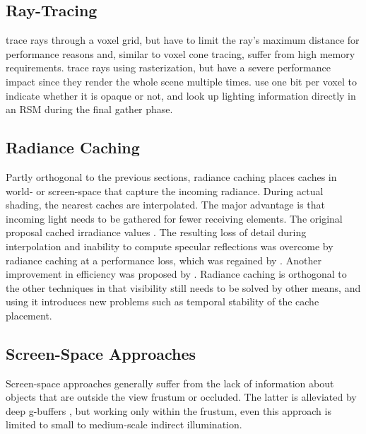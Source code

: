\subsection{Ray-Tracing}

\citet{Thiedemann:2011:VGI} trace rays through a voxel grid, but have to limit the ray's maximum distance for performance reasons and, similar to voxel cone tracing, suffer from high memory requirements. \citet{Tokuyoshi:2012:pathtracingrasterization} trace rays using rasterization, but have a severe performance impact since they render the whole scene multiple times.
\citet{Chen:2016:Compactvoxels} use one bit per voxel to indicate whether it is opaque or not, and look up lighting information directly in an RSM during the final gather phase.


\subsection{Radiance Caching}

Partly orthogonal to the previous sections, radiance caching places caches in world- or screen-space that capture the incoming radiance. During actual shading, the nearest caches are interpolated. The major advantage is that incoming light needs to be gathered for fewer receiving elements.
The original proposal cached irradiance values \citep{Ward:1988:IrradianceCaching}. The resulting loss of detail during interpolation and inability to compute specular reflections was overcome by radiance caching \citep{Krivanek:2005:RadianceCaching} at a performance loss, which was regained by \citet{Scherzer:2012:PreconvolvedRadianceCaching}. Another improvement in efficiency was proposed by \citet{Rehfeld:2014:ClusteredPreconvolvedRadianceCaching}.
Radiance caching is orthogonal to the other techniques in that visibility still needs to be solved by other means, and using it introduces new problems such as temporal stability of the cache placement.


\subsection{Screen-Space Approaches}

Screen-space approaches generally suffer from the lack of information about objects that are outside the view frustum or occluded. The latter is alleviated by deep g-buffers \citep{Mara:2014:DeepGBuffers, Mara:2016:DeepGBuffers2}, but working only within the frustum, even this approach is limited to small to medium-scale indirect illumination.



